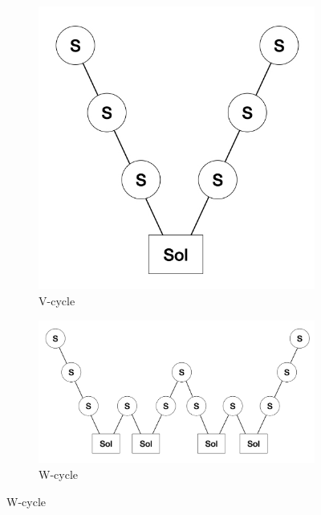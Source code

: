\begin{figure}[h!]
	\centering
	\begin{subfigure}{0.3\columnwidth}
		\centering
        \includegraphics[width=\columnwidth]{MG_Vcycle.jpeg}
		\caption{V-cycle}
	\end{subfigure}
	\begin{subfigure}{0.6\columnwidth}
		\centering
        \includegraphics[width=\columnwidth]{MG_Wcycle.jpeg}
        \caption{W-cycle}
	\end{subfigure}


\end{figure}
